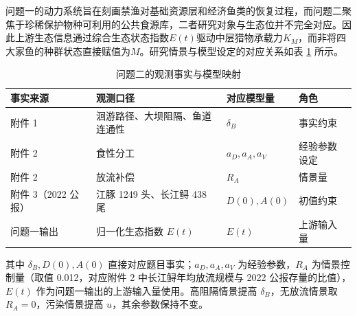 \documentclass{MMCStyle}
\begin{document}
问题一的动力系统旨在刻画禁渔对基础资源层和经济鱼类的恢复过程，而问题二聚焦于珍稀保护物种可利用的公共食源库，二者研究对象与生态位并不完全对应。因此上游生态信息通过综合生态状态指数$E(t)$驱动中层猎物承载力$K_M$，而非将四大家鱼的种群状态直接赋值为$M$。研究情景与模型设定的对应关系如表 \ref{tab:q2map} 所示。
\begin{table}[htbp]
\centering
\caption{问题二的观测事实与模型映射}
\label{tab:q2map}
\begin{tabularx}{0.95\textwidth}{>{\raggedright\arraybackslash}p{2.4cm} >{\raggedright\arraybackslash}p{4.2cm} >{\raggedright\arraybackslash}p{3.6cm} X}
\toprule
事实来源 & 观测口径 & 对应模型量 & 角色 \\
\midrule
附件 1 & 洄游路径、大坝阻隔、鱼道连通性 & $\delta_B$ & 事实约束 \\
附件 2 & 食性分工 & $a_D,a_A,a_V$ & 经验参数设定 \\
附件 2 & 放流补偿 & $R_A$ & 情景量 \\
附件 3（2022 公报） & 江豚 1249 头、长江鲟 438 尾 & $D(0),A(0)$ & 初值约束 \\
问题一输出 & 归一化生态指数 $E(t)$ & $E(t)$ & 上游输入量 \\
\bottomrule
\end{tabularx}
\end{table}
其中 $\delta_B,D(0),A(0)$ 直接对应题目事实；$a_D,a_A,a_V$ 为经验参数，$R_A$ 为情景控制量（取值 0.012，对应附件 2 中长江鲟年均放流规模与 2022 公报存量的比值），$E(t)$ 作为问题一输出的上游输入量使用。高阻隔情景提高 $\delta_B$，无放流情景取 $R_A=0$，污染情景提高 $u$，其余参数保持不变。
\end{document}
